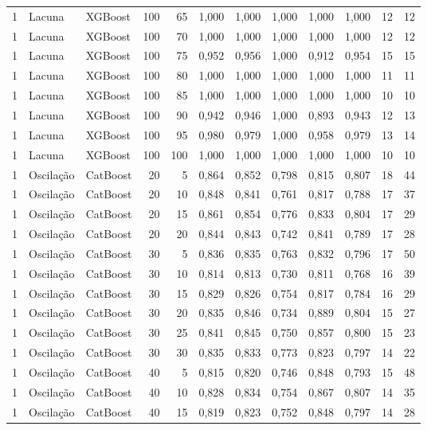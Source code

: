 \begin{longtable}{@{}rllrrrrrrrrr@{}}
1 & Lacuna & XGBoost & 100 & 65 & 1,000 & 1,000 & 1,000 & 1,000 & 1,000 & 12 & 12 \\
1 & Lacuna & XGBoost & 100 & 70 & 1,000 & 1,000 & 1,000 & 1,000 & 1,000 & 12 & 12 \\
1 & Lacuna & XGBoost & 100 & 75 & 0,952 & 0,956 & 1,000 & 0,912 & 0,954 & 15 & 15 \\
1 & Lacuna & XGBoost & 100 & 80 & 1,000 & 1,000 & 1,000 & 1,000 & 1,000 & 11 & 11 \\
1 & Lacuna & XGBoost & 100 & 85 & 1,000 & 1,000 & 1,000 & 1,000 & 1,000 & 10 & 10 \\
1 & Lacuna & XGBoost & 100 & 90 & 0,942 & 0,946 & 1,000 & 0,893 & 0,943 & 12 & 13 \\
1 & Lacuna & XGBoost & 100 & 95 & 0,980 & 0,979 & 1,000 & 0,958 & 0,979 & 13 & 14 \\
1 & Lacuna & XGBoost & 100 & 100 & 1,000 & 1,000 & 1,000 & 1,000 & 1,000 & 10 & 10 \\
1 & Oscilação & CatBoost & 20 & 5 & 0,864 & 0,852 & 0,798 & 0,815 & 0,807 & 18 & 44 \\
1 & Oscilação & CatBoost & 20 & 10 & 0,848 & 0,841 & 0,761 & 0,817 & 0,788 & 17 & 37 \\
1 & Oscilação & CatBoost & 20 & 15 & 0,861 & 0,854 & 0,776 & 0,833 & 0,804 & 17 & 29 \\
1 & Oscilação & CatBoost & 20 & 20 & 0,844 & 0,843 & 0,742 & 0,841 & 0,789 & 17 & 28 \\
1 & Oscilação & CatBoost & 30 & 5 & 0,836 & 0,835 & 0,763 & 0,832 & 0,796 & 17 & 50 \\
1 & Oscilação & CatBoost & 30 & 10 & 0,814 & 0,813 & 0,730 & 0,811 & 0,768 & 16 & 39 \\
1 & Oscilação & CatBoost & 30 & 15 & 0,829 & 0,826 & 0,754 & 0,817 & 0,784 & 16 & 29 \\
1 & Oscilação & CatBoost & 30 & 20 & 0,835 & 0,846 & 0,734 & 0,889 & 0,804 & 15 & 27 \\
1 & Oscilação & CatBoost & 30 & 25 & 0,841 & 0,845 & 0,750 & 0,857 & 0,800 & 15 & 23 \\
1 & Oscilação & CatBoost & 30 & 30 & 0,835 & 0,833 & 0,773 & 0,823 & 0,797 & 14 & 22 \\
1 & Oscilação & CatBoost & 40 & 5 & 0,815 & 0,820 & 0,746 & 0,848 & 0,793 & 15 & 48 \\
1 & Oscilação & CatBoost & 40 & 10 & 0,828 & 0,834 & 0,754 & 0,867 & 0,807 & 14 & 35 \\
1 & Oscilação & CatBoost & 40 & 15 & 0,819 & 0,823 & 0,752 & 0,848 & 0,797 & 14 & 28 \\

\end{longtable}
